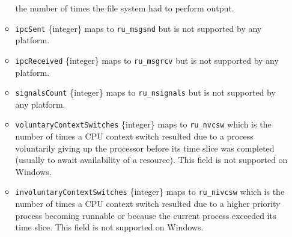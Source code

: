 \begin{itemize}
\begin{itemize}
    the number of times the file system had to perform output.
  \item
    \texttt{ipcSent} \{integer\} maps to \texttt{ru\_msgsnd} but is not
    supported by any platform.
  \item
    \texttt{ipcReceived} \{integer\} maps to \texttt{ru\_msgrcv} but is
    not supported by any platform.
  \item
    \texttt{signalsCount} \{integer\} maps to \texttt{ru\_nsignals} but
    is not supported by any platform.
  \item
    \texttt{voluntaryContextSwitches} \{integer\} maps to
    \texttt{ru\_nvcsw} which is the number of times a CPU context switch
    resulted due to a process voluntarily giving up the processor before
    its time slice was completed (usually to await availability of a
    resource). This field is not supported on Windows.
  \item
    \texttt{involuntaryContextSwitches} \{integer\} maps to
    \texttt{ru\_nivcsw} which is the number of times a CPU context
    switch resulted due to a higher priority process becoming runnable
    or because the current process exceeded its time slice. This field
    is not supported on Windows.
  \end{itemize}
\end{itemize}

\begin{Shaded}
\begin{Highlighting}[]
 \OperatorTok{;}

\NormalTok{(}\NormalTok{())}\OperatorTok{;}
\CommentTok{/*}
\CommentTok{  \{}
\CommentTok{  \}}
\CommentTok{*/}
\end{Highlighting}
\end{Shaded}

